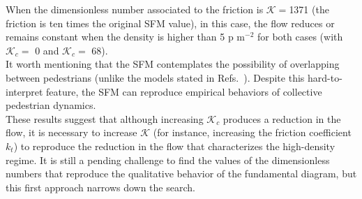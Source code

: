 \documentclass[preprint,12pt]{elsarticle}
\begin{document}
When the dimensionless number associated to the friction is $\mathcal{K}=$1371  (the friction is ten times the original SFM value), in this case, the flow reduces or remains constant when the density is higher than 5 p m$^{-2}$ for both cases (with $\mathcal{K}_c=$ 0 and $\mathcal{K}_c = $ 68).\\

It worth mentioning that the SFM contemplates the possibility of overlapping between pedestrians (unlike the models stated in Refs.~\cite{kabalan_2017,jebrane_2019}). Despite this hard-to-interpret feature, the SFM can reproduce empirical behaviors of collective pedestrian dynamics.\\

These results suggest that although increasing $\mathcal{K}_c$ produces a reduction in the flow, it is necessary to increase $\mathcal{K}$ (for instance, increasing the friction coefficient $k_t$) to reproduce the reduction in the flow that characterizes the high-density regime. It is still a pending challenge to find the values of the dimensionless numbers that reproduce the qualitative behavior of the fundamental diagram, but this first approach narrows down the search.\\

\end{document}
